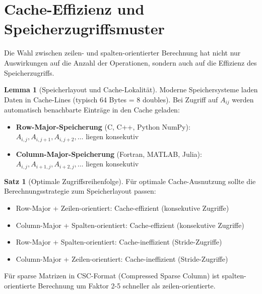 \documentclass[a4paper,12pt]{report}
\theoremstyle{definition}
\newtheorem{satz}{Satz}
\newtheorem{lemma}{Lemma}
\begin{document}
	\section{Cache-Effizienz und Speicherzugriffsmuster}
	
	Die Wahl zwischen zeilen- und spalten-orientierter Berechnung hat nicht nur Auswirkungen auf die Anzahl der Operationen, sondern auch auf die Effizienz des Speicherzugriffs.
	
	\begin{lemma}[Speicherlayout und Cache-Lokalität]
		Moderne Speichersysteme laden Daten in Cache-Lines (typisch 64 Bytes = 8 doubles). Bei Zugriff auf $A_{ij}$ werden automatisch benachbarte Einträge in den Cache geladen:
		\begin{itemize}
			\item \textbf{Row-Major-Speicherung} (C, C++, Python NumPy): $A_{i,j}, A_{i,j+1}, A_{i,j+2}, \ldots$ liegen konsekutiv
			\item \textbf{Column-Major-Speicherung} (Fortran, MATLAB, Julia): $A_{i,j}, A_{i+1,j}, A_{i+2,j}, \ldots$ liegen konsekutiv
		\end{itemize}
	\end{lemma}
	
	\begin{satz}[Optimale Zugriffsreihenfolge]
		Für optimale Cache-Ausnutzung sollte die Berechnungsstrategie zum Speicherlayout passen:
		\begin{itemize}
			\item Row-Major + Zeilen-orientiert: Cache-effizient (konsekutive Zugriffe)
			\item Column-Major + Spalten-orientiert: Cache-effizient (konsekutive Zugriffe)
			\item Row-Major + Spalten-orientiert: Cache-ineffizient (Stride-Zugriffe)
			\item Column-Major + Zeilen-orientiert: Cache-ineffizient (Stride-Zugriffe)
		\end{itemize}
		
		Für sparse Matrizen in CSC-Format (Compressed Sparse Column) ist spalten-orientierte Berechnung um Faktor 2-5 schneller als zeilen-orientierte.
	\end{satz}
	
\end{document}
